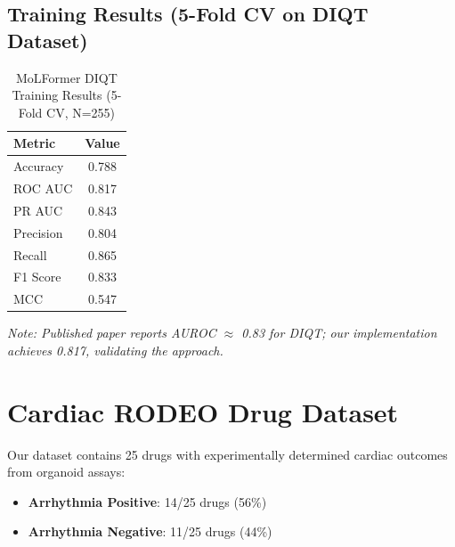 \documentclass[11pt]{article}
\begin{document}
\subsection{Training Results (5-Fold CV on DIQT Dataset)}

\begin{table}[H]
\centering
\caption{MoLFormer DIQT Training Results (5-Fold CV, N=255)}
\begin{tabular}{lc}
\toprule
\textbf{Metric} & \textbf{Value} \\
\midrule
Accuracy & 0.788 \\
ROC AUC & 0.817 \\
PR AUC & 0.843 \\
Precision & 0.804 \\
Recall & 0.865 \\
F1 Score & 0.833 \\
MCC & 0.547 \\
\bottomrule
\end{tabular}
\end{table}

\textit{Note: Published paper reports AUROC $\approx$ 0.83 for DIQT; our implementation achieves 0.817, validating the approach.}


\section{Cardiac RODEO Drug Dataset}

Our dataset contains 25 drugs with experimentally determined cardiac outcomes from organoid assays:

\begin{itemize}
    \item \textbf{Arrhythmia Positive}: 14/25 drugs (56\%)
    \item \textbf{Arrhythmia Negative}: 11/25 drugs (44\%)
\end{itemize}
\end{document}
